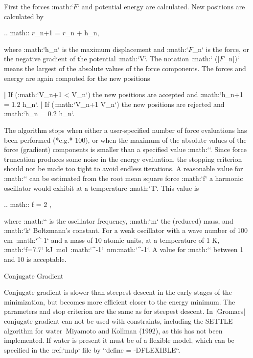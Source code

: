 {First the forces :math:`{\mbox{\boldmath ${F}$}}` and potential energy
are calculated. New positions are calculated by

  .. math:: {\mbox{\boldmath ${r}$}}_{n+1} =  {\mbox{\boldmath ${r}$}}_n +  h_n,

where :math:`h_n` is the maximum displacement and
:math:`{\mbox{\boldmath ${F}$}}_n` is the force, or the negative
gradient of the potential :math:`V`. The notation :math:`\max
(|{\mbox{\boldmath ${F}$}}_n|)` means the largest of the absolute
values of the force components. The forces and energy are again
computed for the new positions

| If (:math:`V_{n+1} < V_n`) the new positions are accepted and
  :math:`h_{n+1} = 1.2
  h_n`.
| If (:math:`V_{n+1} \geq V_n`) the new positions are rejected and
  :math:`h_n = 0.2 h_n`.

The algorithm stops when either a user-specified number of force
evaluations has been performed (*e.g.* 100), or when the maximum of the
absolute values of the force (gradient) components is smaller than a
specified value :math:`\epsilon`. Since force truncation produces some
noise in the energy evaluation, the stopping criterion should not be
made too tight to avoid endless iterations. A reasonable value for
:math:`\epsilon` can be estimated from the root mean square force
:math:`f` a harmonic oscillator would exhibit at a temperature
:math:`T`. This value is

.. math:: f = 2 \pi \nu {},

where :math:`\nu` is the oscillator frequency, :math:`m` the (reduced)
mass, and :math:`k` Boltzmann’s constant. For a weak oscillator with a
wave number of 100 cm\ :math:`^{-1}` and a mass of 10 atomic units, at a
temperature of 1 K, :math:`f=7.7` kJ mol\ :math:`^{-1}` nm:math:`^{-1}`.
A value for :math:`\epsilon` between 1 and 10 is acceptable.

Conjugate Gradient
~~~~~~~~~~~~~~~~~~

Conjugate gradient is slower than steepest descent in the early stages
of the minimization, but becomes more efficient closer to the energy
minimum. The parameters and stop criterion are the same as for steepest
descent. In |Gromacs| conjugate gradient can not be used with constraints,
including the SETTLE algorithm for water Miyamoto and Kollman (1992), as
this has not been implemented. If water is present it must be of a
flexible model, which can be specified in the :ref:`mdp` file
by ``define = -DFLEXIBLE``.

}
